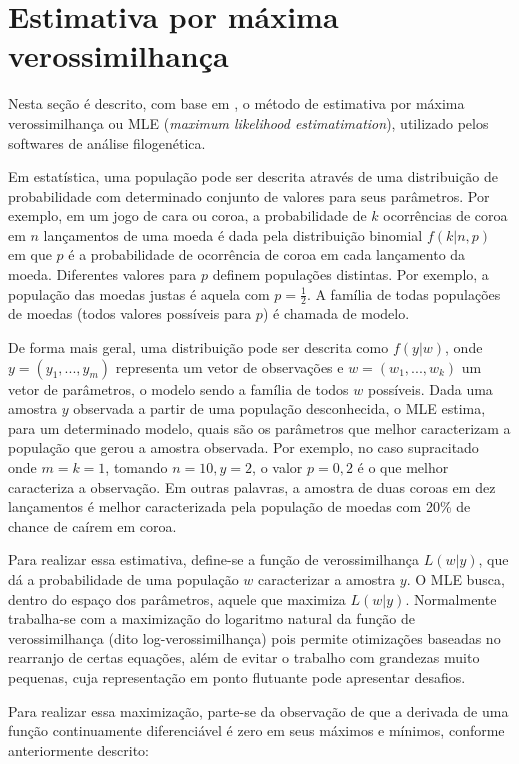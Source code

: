 \documentclass[cic,tc]{iiufrgs}
\begin{document}
\section{Estimativa por máxima verossimilhança}
\label{sec:mle}

Nesta seção é descrito, com base em \cite{myung2003tutorial}, o método de
estimativa por máxima verossimilhança ou MLE (\textit{maximum likelihood
estimatimation}), utilizado pelos softwares de análise filogenética.

Em estatística, uma população pode ser descrita através de uma distribuição de
probabilidade com determinado conjunto de valores para seus parâmetros.
Por exemplo, em um jogo de cara ou coroa, a probabilidade de $k$ ocorrências de
coroa em $n$ lançamentos de uma moeda é dada pela distribuição binomial
$f(k|n,p)$ em que $p$ é a probabilidade de ocorrência de coroa em cada
lançamento da moeda. Diferentes valores para $p$ definem populações distintas.
Por exemplo, a população das moedas justas é aquela com $p = \frac{1}{2}$. A
família de todas populações de moedas (todos valores possíveis para $p$) é
chamada de modelo.

De forma mais geral, uma distribuição pode ser descrita como $f(y|w)$, onde $y
= (y_1, ..., y_m)$ representa um vetor de observações e $w = (w_1, ..., w_k)$
um vetor de parâmetros, o modelo sendo a família de todos $w$ possíveis. Dada
uma amostra $y$ observada a partir de uma população desconhecida, o MLE estima,
para um determinado modelo, quais são os parâmetros que melhor caracterizam a
população que gerou a amostra observada. Por exemplo, no caso supracitado
onde $m = k = 1$, tomando $n = 10, y = 2$, o valor $p = 0{,}2$ é o que melhor
caracteriza a observação. Em outras palavras, a amostra de duas coroas em dez
lançamentos é melhor caracterizada pela população de moedas com 20\% de chance
de caírem em coroa.

Para realizar essa estimativa, define-se a função de verossimilhança $L(w|y)$,
que dá a probabilidade de uma população $w$ caracterizar a amostra $y$. O MLE
busca, dentro do espaço dos parâmetros, aquele que maximiza $L(w|y)$.
Normalmente trabalha-se com a maximização do logaritmo natural da função de
verossimilhança (dito log-verossimilhança) pois permite otimizações baseadas no
rearranjo de certas equações, além de evitar o trabalho com grandezas muito
pequenas, cuja representação em ponto flutuante pode apresentar desafios.

Para realizar essa maximização, parte-se da observação de que a derivada de uma
função continuamente diferenciável é zero em seus máximos e mínimos, conforme
anteriormente descrito:
\end{document}
